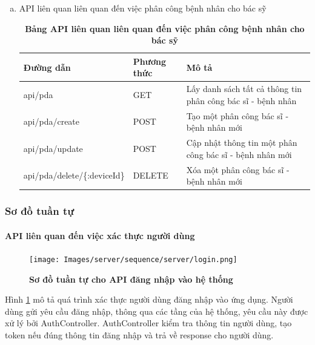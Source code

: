 \begin{enumerate}[a)]
\begin{table}[H]
\begin{tabularx}{0.9\textwidth}{
  | >{\raggedright\arraybackslash}X
  | >{\raggedright\arraybackslash}m{2cm}
  | >{\raggedright\arraybackslash}X|
  }
  \end{tabularx}
  \label{table_api_device}
\end{table}


\item API liên quan liên quan đến việc phân công bệnh nhân cho bác sỹ

\begin{table}[H]
  \centering
  \caption{\bfseries \fontsize{12pt}{0pt}\selectfont Bảng API liên quan liên quan đến việc phân công bệnh nhân cho bác sỹ}
  \begin{tabularx}{0.9\textwidth}{
  | >{\raggedright\arraybackslash}X
  | >{\raggedright\arraybackslash}m{2cm}
  | >{\raggedright\arraybackslash}X|
  }
  \hline
  \bfseries Đường dẫn    &\bfseries Phương thức    &\bfseries Mô tả\\ \hline
  api/pda   &   GET  & Lấy danh sách tất cả thông tin phân công bác sĩ - bệnh nhân \\ \hline
  api/pda/create  &    POST    & Tạo một phân công bác sĩ - bệnh nhân mới \\ \hline
  api/pda/update  &    POST    & Cập nhật thông tin một phân công bác sĩ - bệnh nhân mới \\ \hline
  api/pda/delete/\{:deviceId\}  &    DELETE    & Xóa một phân công bác sĩ - bệnh nhân mới \\ \hline


  \end{tabularx}
  \label{table_api_pda}
\end{table}



\end{enumerate}




\subsubsection{Sơ đồ tuần tự}



\paragraph{API liên quan đến việc xác thực người dùng}
\mbox{}

\begin{figure}[H]
  \centering
  \texttt{[image: Images/server/sequence/server/login.png]}
  \caption[Sơ đồ tuần tự cho API đăng nhập vào hệ thống]{\bfseries \fontsize{12pt}{0pt}
  \selectfont Sơ đồ tuần tự cho API đăng nhập vào hệ thống }
  \label{backend_login} %
\end{figure}
Hình \ref{backend_login}  mô tả quá trình xác thực người dùng đăng nhập vào ứng dụng. Người dùng gửi yêu cầu đăng nhập, thông qua các tầng của hệ thống, yêu cầu này được xử lý bởi AuthController. AuthController kiểm tra thông tin người dùng, tạo token nếu đúng thông tin đăng nhập và trả về response cho người dùng.

